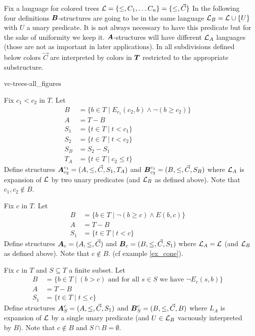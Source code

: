 \documentclass{amsart}
\DeclareMathOperator{\TT}{\boldface T}
\DeclareMathOperator{\A}{\boldface A}
\DeclareMathOperator{\B}{\boldface B}
\begin{document}
Fix a language for colored trees $\mathcal L = \{\leq, C_1, \ldots C_n\} = \{\leq, \vec C\}$ In the following four definitions $\B$-structures are going to be in the same language $\mathcal L_B = \mathcal L \cup \{U\}$ with $U$ a unary predicate. It is not always necessary to have this predicate but for the sake of uniformity we keep it. $\A$-structures will have different $\mathcal L_A$ languages (those are not as important in later applications). In all subdivisions defined below colors $\vec C$ are interpreted by colors in $\TT$ restricted to the appropriate substructure.

 {vc-trees-all_figures}

\begin{Definition}
	Fix $c_1 < c_2$ in $T$. Let
	\begin{align*}
		B &= \{b \in T \mid E_{c_1}(c_2, b) \wedge \neg(b \geq c_2)\} \\
		A &= T - B \\
		S_1 &= \{t \in T \mid t < c_1\} \\
		S_2 &= \{t \in T \mid t < c_2\} \\
		S_B &= S_2 - S_1 \\
		T_A &= \{t \in T \mid c_2 \leq t\}
	\end{align*}
	Define structures $\A^{c_1}_{c_2} = (A, \leq, \vec C, S_1, T_A)$ and $\B^{c_1}_{c_2} = (B, \leq, \vec C, S_B)$ where $\mathcal L_A$ is expansion of $\mathcal L$ by two unary predicates (and $\mathcal L_B$ as defined above). Note that $c_1, c_2 \notin B$.
\end{Definition}


\begin{Definition}
	Fix $c$ in $T$. Let
	\begin{align*}
		B &= \{b \in T \mid \neg(b \geq c) \wedge E(b,c)\} \\
		A &= T - B \\
		S_1 &= \{t \in T \mid t < c\}
	\end{align*}
	Define structures $\A_{c} = (A, \leq, \vec C)$ and $\B_{c} = (B, \leq, \vec C, S_1)$ where $\mathcal L_A = \mathcal L$ (and $\mathcal L_B$ as defined above). Note that $c \notin B$. (cf example \ref{ex_cone}).
\end{Definition}

\begin{Definition}
	Fix $c$ in $T$ and $S \subseteq T$ a finite subset. Let
	\begin{align*}
		B &= \{b \in T \mid (b > c) \text{ and for all $s \in S$ we have } \neg E_c(s, b)\} \\
		A &= T - B \\
		S_1 &= \{t \in T \mid t \leq c\}
	\end{align*}
	Define structures $\A^{c}_{S} = (A, \leq, \vec C, S_1)$ and $\B^{c}_{S} = (B, \leq, \vec C, B)$ where $L_A$ is expansion of $\mathcal L$ by a single unary predicate (and $U \in \mathcal L_B$ vacuously interpreted by $B$). Note that $c \notin B$ and $S \cap B = \emptyset$.
\end{Definition}
\end{document}
